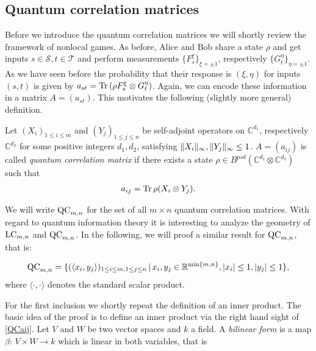 \subsection{Quantum correlation matrices}
Before we introduce the quantum correlation matrices we will shortly review the framework of nonlocal games. As before, Alice and Bob share a state $ \rho $ and get inputs $ s \in \mathcal{S}, t \in \mathcal{T} $ and perform measurements $ \{ F_s^{\xi} \}_{\xi = \pm 1} $, respectively $ \{ G_t^{\eta} \}_{\eta = \pm 1} $.
As we have seen before the probability that their response is $ (\xi,\eta) $ for inputs $ (s,t) $ is given by 
$ a_{st} = \textup{Tr} \, {(\rho F_s^\xi \otimes G_t^\eta )}  $. Again, we can encode these information in a matrix $ A=(a_{st}) $. This motivates the following (slightly more general) definition. 
\begin{dfn}
	Let $ (X_i)_{1 \le i \le m } $ and $ (Y_j)_{1 \le j \le n} $ be self-adjoint operators on $ \mathbb{C}^{d_1} $, respectively $ \mathbb{C}^{d_2} $ for some positive integers $ d_1,d_2 $, satisfying $  \Vert {X_i} \Vert_{\infty},  \Vert {Y_j} \Vert_{\infty} \le 1 $. $ A = (a_{ij}) $ is called {\itshape quantum correlation matrix} if there exists a state $ \rho \in B^{psd}(\mathbb{C}^{d_1} \otimes \mathbb{C}^{d_2})$ such that 
	\begin{align}\label{QCaij}
	a_{ij} = \textup{Tr} \, {\rho (X_i \otimes Y_j)} .
	\end{align}
\end{dfn}
\noindent We will write $ \textup{QC}_{m,n} $ for the set of all $ m \times n $ quantum correlation matrices.
With regard to quantum information theory it is interesting to analyze the geometry of $ \textup{LC}_{m,n} $ and $ \textup{QC}_{m,n} $. In the following, we will proof a similar result for $ \textup{QC}_{m,n} $, that is: 
\begin{lemma}\label{LemQC}
	\begin{align}\label{EqQC}
		\textup{QC}_{m,n} = \{ (\langle x_i,y_j \rangle)_{1 \le i \le m, 1 \le j \le n} \,| \, x_i,y_j \in \mathbb{R}^{ \min \{m,n \} }, \vert x_i  \vert \le 1, \vert y_j \vert \le 1  \},
	\end{align}
	where $ \langle \cdot , \cdot \rangle $ denotes the standard scalar product. 
\end{lemma}
\noindent For the first inclusion we shortly repeat the definition of an inner product. The basic idea of the proof is to define an inner product via the  right hand sight of \ref{QCaij}.
Let $ V $ and $ W $ be two vector spaces and $ k  $ a field. A {\itshape bilinear form} is a map $ \beta: \, V \times W \to k $ which is linear in both variables, that is 
